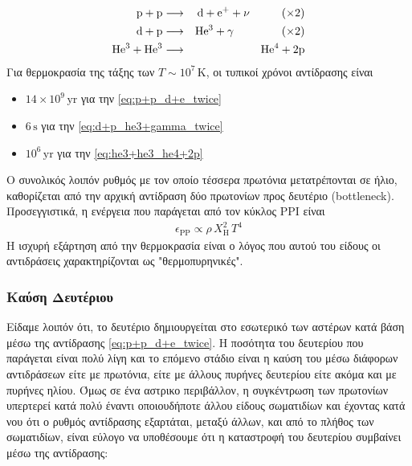 \begin{eqnarray}
\rm p + p & \longrightarrow & \rm d + e^{+} + \nu  \hspace{1cm} (\times 2) \label{eq:p+p_d+e_twice}\\ 
\rm d + p & \longrightarrow & \rm He^3 + \gamma \hspace{1.5cm} (\times 2) \label{eq:d+p_he3+gamma_twice}\\
\rm He^3 + He^3 & \longrightarrow & \rm He^4 + 2p \label{eq:he3+he3_he4+2p}
\end{eqnarray}
Για θερμοκρασία της τάξης των $T \sim 10^7 \,\text{K}$, οι τυπικοί χρόνοι αντίδρασης είναι 
\begin{itemize}
    \item $14 \times 10^9 \,\text{yr}$ για την \eqref{eq:p+p_d+e_twice}
    \item $6 \,\text{s}$ για την \eqref{eq:d+p_he3+gamma_twice}
    \item $10^6 \,\text{yr}$ για την \eqref{eq:he3+he3_he4+2p}
\end{itemize}
Ο συνολικός λοιπόν ρυθμός με τον οποίο τέσσερα πρωτόνια μετατρέπονται σε ήλιο, καθορίζεται από την αρχική αντίδραση δύο πρωτονίων προς δευτέριο (bottleneck). Προσεγγιστικά, η ενέργεια που παράγεται από τον κύκλος PPI είναι
\begin{eqnarray}
    \label{eq:ppi_energy}
    \epsilon_{\text{PP}} \propto \rho \,X_{\text{H}}^2 \,T^4 
\end{eqnarray}
Η ισχυρή εξάρτηση από την θερμοκρασία είναι ο λόγος που αυτού του είδους οι αντιδράσεις χαρακτηρίζονται ως "θερμοπυρηνικές".
\subsubsection{Καύση Δευτέριου}
Είδαμε λοιπόν ότι, το δευτέριο δημιουργείται στο εσωτερικό των αστέρων κατά βάση μέσω της αντίδρασης \eqref{eq:p+p_d+e_twice}. Η ποσότητα του δευτερίου που παράγεται είναι πολύ λίγη και το επόμενο στάδιο είναι η καύση του μέσω διάφορων αντιδράσεων είτε με πρωτόνια, είτε με άλλους πυρήνες δευτερίου είτε ακόμα και με πυρήνες ηλίου. Όμως σε ένα αστρικο περιβάλλον, η συγκέντρωση των πρωτονίων υπερτερεί κατά πολύ έναντι οποιουδήποτε άλλου είδους σωματιδίων και έχοντας κατά νου ότι ο ρυθμός αντίδρασης εξαρτάται, μεταξύ άλλων, και από το πλήθος των σωματιδίων, είναι εύλογο να υποθέσουμε ότι η καταστροφή του δευτερίου συμβαίνει μέσω της αντίδρασης:


